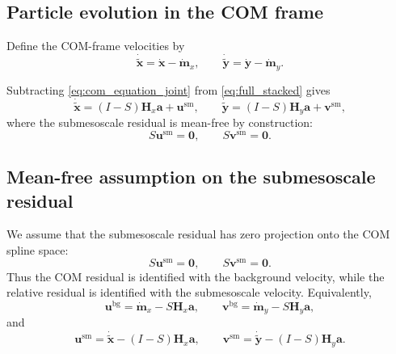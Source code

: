 \documentclass{article}
\begin{document}
\subsection{Particle evolution in the COM frame}

Define the COM-frame velocities by
\begin{equation}
\dot{\tilde{\mathbf{x}}}=\dot{\mathbf{x}}-\dot{\mathbf{m}}_x,
\qquad
\dot{\tilde{\mathbf{y}}}=\dot{\mathbf{y}}-\dot{\mathbf{m}}_y.
\label{eq:tilde_vels}
\end{equation}

Subtracting \eqref{eq:com_equation_joint} from \eqref{eq:full_stacked} gives
\begin{equation}
\dot{\tilde{\mathbf{x}}}
=
(I-S)\mathbf{H}_x\mathbf{a}
+
\mathbf{u}^{\mathrm{sm}},
\qquad
\dot{\tilde{\mathbf{y}}}
=
(I-S)\mathbf{H}_y\mathbf{a}
+
\mathbf{v}^{\mathrm{sm}},
\label{eq:relative_equation_joint}
\end{equation}
where the submesoscale residual is mean-free by construction:
\begin{equation}
S\mathbf{u}^{\mathrm{sm}}=\mathbf{0},
\qquad
S\mathbf{v}^{\mathrm{sm}}=\mathbf{0}.
\end{equation}

\subsection{Mean-free assumption on the submesoscale residual}

We assume that the submesoscale residual has zero projection onto the
COM spline space:
\begin{equation}
S\mathbf{u}^{\mathrm{sm}}=\mathbf{0},
\qquad
S\mathbf{v}^{\mathrm{sm}}=\mathbf{0}.
\end{equation}
Thus the COM residual is identified with the background velocity, while
the relative residual is identified with the submesoscale velocity.
Equivalently,
\begin{equation}
\mathbf{u}^{\mathrm{bg}} = \dot{\mathbf{m}}_x - S\mathbf{H}_x\mathbf{a},
\qquad
\mathbf{v}^{\mathrm{bg}} = \dot{\mathbf{m}}_y - S\mathbf{H}_y\mathbf{a},
\label{eq:bg_residual_def}
\end{equation}
and
\begin{equation}
\mathbf{u}^{\mathrm{sm}} = \dot{\tilde{\mathbf{x}}} - (I-S)\mathbf{H}_x\mathbf{a},
\qquad
\mathbf{v}^{\mathrm{sm}} = \dot{\tilde{\mathbf{y}}} - (I-S)\mathbf{H}_y\mathbf{a}.
\label{eq:sm_residual_def}
\end{equation}
\end{document}
